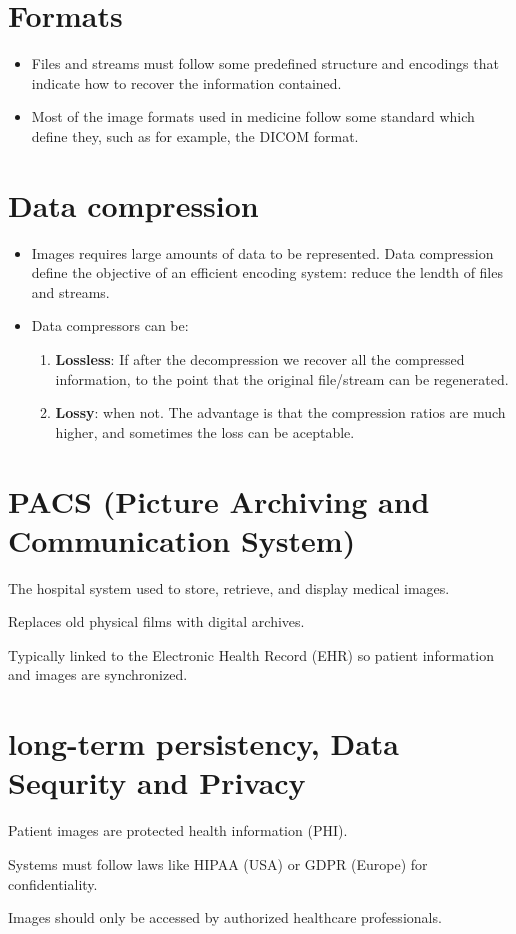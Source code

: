\section{Formats}
\begin{itemize}
\item Files and streams must follow some predefined structure and
encodings that indicate how to recover the information contained.
\item Most of the image formats used in medicine follow some standard
which define they, such as for example, the DICOM format.
\end{itemize}

\section{Data compression}
\begin{itemize}
\item Images requires large amounts of data to be represented. Data
compression define the objective of an efficient encoding system:
reduce the lendth of files and streams.
\item Data compressors can be:
\begin{enumerate}
\item \textbf{Lossless}: If after the decompression we recover all the
compressed information, to the point that the original file/stream can
be regenerated.
\item \textbf{Lossy}: when not. The advantage is that the compression
ratios are much higher, and sometimes the loss can be aceptable.
\end{enumerate}
\end{itemize}

\section{PACS (Picture Archiving and Communication System)}

The hospital system used to store, retrieve, and display medical images.

Replaces old physical films with digital archives.

Typically linked to the Electronic Health Record (EHR) so patient information and images are synchronized.

\section{long-term persistency, Data Sequrity and Privacy}
Patient images are protected health information (PHI).

Systems must follow laws like HIPAA (USA) or GDPR (Europe) for confidentiality.

Images should only be accessed by authorized healthcare professionals.
